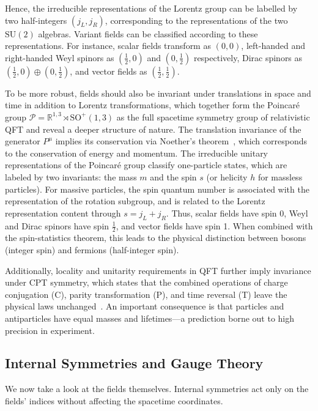 Hence, the irreducible representations of the Lorentz group can be labelled by two half-integers $(j_L,j_R)$, corresponding to the representations of the two $\mathrm{SU}(2)$ algebras.
Variant fields can be classified according to these representations. For instance, scalar fields transform as $(0,0)$, left-handed and right-handed Weyl spinors as $(\tfrac{1}{2},0)$ and $(0,\tfrac{1}{2})$ respectively, Dirac spinors as $(\tfrac{1}{2},0)\oplus(0,\tfrac{1}{2})$, and vector fields as $(\tfrac{1}{2},\tfrac{1}{2})$.

To be more robust, fields should also be invariant under translations in space and time in addition to Lorentz transformations, which together form the Poincaré group $\mathcal{P}=\mathbb{R}^{1,3} \rtimes \mathrm{SO}^+(1,3)$ as the full spacetime symmetry group of relativistic QFT and reveal a deeper structure of nature.
The translation invariance of the generator $P^{\mu}$ implies its conservation via Noether's theorem~\cite{Noether1971}, which corresponds to the conservation of energy and momentum.
The irreducible unitary representations of the Poincaré group classify one-particle states, which are labeled by two invariants: the mass $m$ and the spin $s$ (or helicity $h$ for massless particles).
For massive particles, the spin quantum number is associated with the representation of the rotation subgroup, and is related to the Lorentz representation content through $s = j_L + j_R$.
Thus, scalar fields have spin 0, Weyl and Dirac spinors have spin $\tfrac{1}{2}$, and vector fields have spin 1.
When combined with the spin-statistics theorem, this leads to the physical distinction between bosons (integer spin) and fermions (half-integer spin).

Additionally, locality and unitarity requirements in QFT further imply invariance under CPT symmetry, which states that the combined operations of charge conjugation (C), parity transformation (P), and time reversal (T) leave the physical laws unchanged~\cite{Luders1954,Pauli1955,StreaterWightman1989PCT}.
An important consequence is that particles and antiparticles have equal masses and lifetimes—a prediction borne out to high precision in experiment.

\subsection{Internal Symmetries and Gauge Theory}\label{subsec:internal}

We now take a look at the fields themselves. Internal symmetries act only on the fields' indices without affecting the spacetime coordinates.

